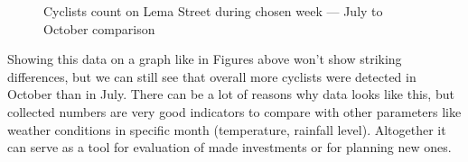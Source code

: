 \begin{figure}[H]
    \centering
    \caption{Cyclists count on Lema Street during chosen week --- July to October comparison}
    \label{fig:lemaCount}
\end{figure}

Showing this data on a graph like in Figures above won't show striking differences, but we can still see that overall more cyclists were detected in October than in July. There can be a lot of reasons why data looks like this, but collected numbers are very good indicators to compare with other parameters like weather conditions in specific month (temperature, rainfall level). Altogether it can serve as a tool for evaluation of made investments or for planning new ones.